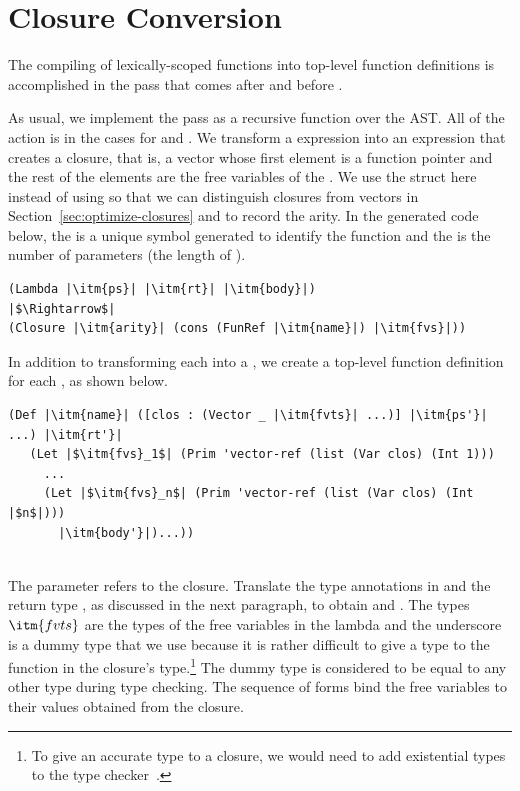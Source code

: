 \documentclass[11pt]{book}
\begin{document}
\section{Closure Conversion}
\label{sec:closure-conversion}

The compiling of lexically-scoped functions into top-level function
definitions is accomplished in the pass 
that comes after  and before
. 

As usual, we implement the pass as a recursive function over the
AST. All of the action is in the cases for  and
. We transform a  expression into an expression
that creates a closure, that is, a vector whose first element is a
function pointer and the rest of the elements are the free variables
of the . We use the struct  here instead of
using  so that we can distinguish closures from vectors
in Section~\ref{sec:optimize-closures} and to record the arity.  In
the generated code below, the  is a unique symbol generated
to identify the function and the  is the number of
parameters (the length of ).
\begin{lstlisting}
(Lambda |\itm{ps}| |\itm{rt}| |\itm{body}|)
|$\Rightarrow$|
(Closure |\itm{arity}| (cons (FunRef |\itm{name}|) |\itm{fvs}|))
\end{lstlisting}
In addition to transforming each  into a , we
create a top-level function definition for each , as
shown below.\\
\begin{minipage}{0.8\textwidth}
\begin{lstlisting}
(Def |\itm{name}| ([clos : (Vector _ |\itm{fvts}| ...)] |\itm{ps'}| ...) |\itm{rt'}|
   (Let |$\itm{fvs}_1$| (Prim 'vector-ref (list (Var clos) (Int 1)))
     ...
     (Let |$\itm{fvs}_n$| (Prim 'vector-ref (list (Var clos) (Int |$n$|)))
       |\itm{body'}|)...))
\end{lstlisting}
\end{minipage}\\
The  parameter refers to the closure.  Translate the type
annotations in  and the return type , as discussed in
the next paragraph, to obtain  and .  The types
$\itm{fvts}$ are the types of the free variables in the lambda and the
underscore \code{\_} is a dummy type that we use because it is rather
difficult to give a type to the function in the closure's
type.\footnote{To give an accurate type to a closure, we would need to
  add existential types to the type checker~\citep{Minamide:1996ys}.}
The dummy type is considered to be equal to any other type during type
checking.  The sequence of  forms bind the free variables to
their values obtained from the closure.
\end{document}
